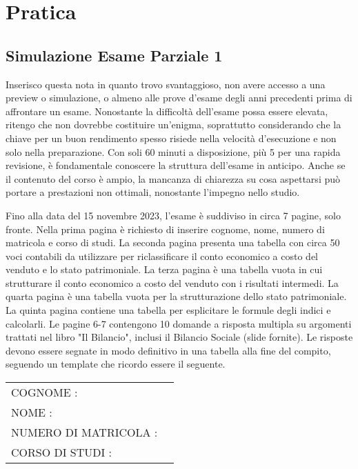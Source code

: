 \documentclass{book}
\begin{document}
\newpage
\chapter{Pratica}
\section{Simulazione Esame Parziale 1}
Inserisco questa nota in quanto trovo svantaggioso, non avere accesso a una preview o simulazione, o almeno alle prove d'esame degli anni precedenti prima di affrontare un esame. Nonostante la difficoltà dell'esame possa essere elevata, ritengo che non dovrebbe costituire un'enigma, soprattutto considerando che la chiave per un buon rendimento spesso risiede nella velocità d'esecuzione e non solo nella preparazione. Con soli 60 minuti a disposizione, più 5 per una rapida revisione, è fondamentale conoscere la struttura dell'esame in anticipo. Anche se il contenuto del corso è ampio, la mancanza di chiarezza su cosa aspettarsi può portare a prestazioni non ottimali, nonostante l'impegno nello studio.

Fino alla data del 15 novembre 2023, l'esame è suddiviso in circa 7 pagine, solo fronte. Nella prima pagina è richiesto di inserire cognome, nome, numero di matricola e corso di studi. La seconda pagina presenta una tabella con circa 50 voci contabili da utilizzare per riclassificare il conto economico a costo del venduto e lo stato patrimoniale. La terza pagina è una tabella vuota in cui strutturare il conto economico a costo del venduto con i risultati intermedi. La quarta pagina è una tabella vuota per la strutturazione dello stato patrimoniale. La quinta pagina contiene una tabella per esplicitare le formule degli indici e calcolarli. Le pagine 6-7 contengono 10 domande a risposta multipla su argomenti trattati nel libro "Il Bilancio", inclusi il Bilancio Sociale (slide fornite). Le risposte devono essere segnate in modo definitivo in una tabella alla fine del compito, seguendo un template che ricordo essere il seguente.

\newpage

\begin{table}[ht]
    \Huge{
\begin{tabular}{l c}
    COGNOME : &\\
    NOME : &\\
    NUMERO DI MATRICOLA : &\\
    CORSO DI STUDI : & \\
\end{tabular}
}
\end{table}
\end{document}

